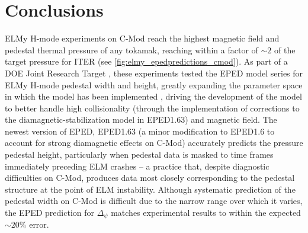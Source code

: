 \section{Conclusions}\label{sec:elmy_conclusion}

ELMy H-mode experiments on C-Mod reach the highest magnetic field and pedestal thermal pressure of any tokamak, reaching within a factor of $\sim 2$ of the target pressure for ITER (see \cref{fig:elmy_epedpredictions_cmod}).  As part of a DOE Joint Research Target \cite{Groebner2013}, these experiments tested the EPED model series \cite{Snyder2009} for ELMy H-mode pedestal width and height, greatly expanding the parameter space in which the model has been implemented \cite{Walk2012}, driving the development of the model to better handle high collisionality (through the implementation of corrections to the diamagnetic-stabilization model in EPED1.63) and magnetic field.  The newest version of EPED, EPED1.63 (a minor modification to EPED1.6 to account for strong diamagnetic effects on C-Mod) accurately predicts the pressure pedestal height, particularly when pedestal data is masked to time frames immediately preceding ELM crashes -- a practice that, despite diagnostic difficulties on C-Mod, produces data most closely corresponding to the pedestal structure at the point of ELM instability.  Although systematic prediction of the pedestal width on C-Mod is difficult due to the narrow range over which it varies, the EPED prediction for $\Delta_\psi$ matches experimental results to within the expected $\sim 20\%$ error.  

\begin{figure}[t]
 \pushtooutside
\end{figure}


